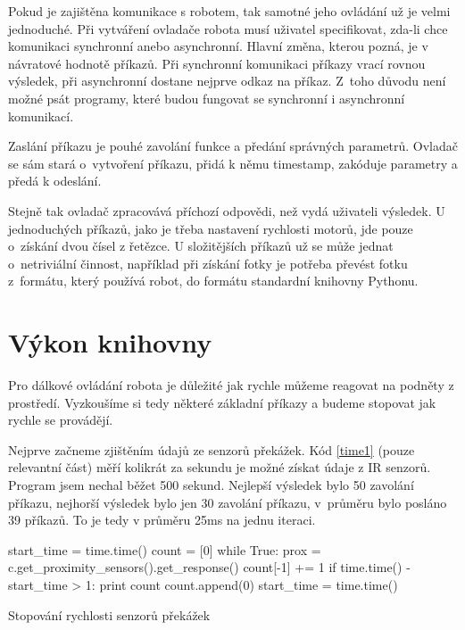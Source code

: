     Pokud je zajištěna komunikace s robotem, tak samotné jeho ovládání už je
    velmi jednoduché. Při vytváření ovladače robota musí uživatel specifikovat,
    zda-li chce komunikaci synchronní anebo asynchronní. Hlavní změna, kterou
    pozná, je v návratové hodnotě příkazů. Při synchronní komunikaci příkazy
    vrací rovnou výsledek, při asynchronní dostane nejprve odkaz na příkaz.
    Z~toho důvodu není možné psát programy, které budou fungovat se synchronní
    i asynchronní komunikací.

    Zaslání příkazu je pouhé zavolání funkce a předání správných parametrů.
    Ovladač se sám stará o~vytvoření příkazu, přidá k němu timestamp, zakóduje
    parametry a předá k odeslání.

    Stejně tak ovladač zpracovává příchozí odpovědi, než vydá uživateli
    výsledek. U jednoduchých příkazů, jako je třeba nastavení rychlosti motorů,
    jde pouze o~získání dvou čísel z řetězce. U složitějších příkazů už se může
    jednat o~netriviální činnost, například při získání fotky je potřeba
    převést fotku z~formátu, který používá robot, do formátu standardní
    knihovny Pythonu.

    \section{Výkon knihovny}
    \label{benchmark}

    Pro dálkové ovládání robota je důležité jak rychle můžeme reagovat na
    podněty z prostředí. Vyzkoušíme si tedy některé základní příkazy a budeme
    stopovat jak rychle se provádějí.

    Nejprve začneme zjištěním údajů ze senzorů překážek. Kód \ref{time1} (pouze
    relevantní část) měří kolikrát za sekundu je možné získat údaje z IR
    senzorů. Program jsem nechal běžet 500 sekund. Nejlepší výsledek bylo 50
    zavolání příkazu, nejhorší výsledek bylo jen 30 zavolání příkazu, v~průměru
    bylo posláno 39 příkazů. To je tedy v průměru 25ms na jednu iteraci.

\begin{listing}
\begin{pyc}
start_time = time.time()
count = [0]
while True:
    prox = c.get_proximity_sensors().get_response()
    count[-1] += 1
    if time.time() - start_time > 1:
        print count
        count.append(0)
        start_time = time.time()
\end{pyc}
\caption{Stopování rychlosti senzorů překážek}
\label{time1}
\end{listing}


